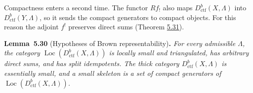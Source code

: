 \documentclass[11pt]{article}
\newenvironment{bpstatement}[2]{\par\addvspace{0.6\baselineskip}\noindent\textbf{#1}#2\textbf{.}\enspace\ignorespaces}
  {\par\addvspace{0.4\baselineskip}}
\newenvironment{bpstatementit}[2]{\begin{bpstatement}{#1}{#2}\itshape\ignorespaces}{\end{bpstatement}}
\providecommand{\Loc}{}\renewcommand{\Loc}{\operatorname{Loc}}
\begin{document}
Compactness enters a second time. The functor \(Rf_!\) also maps \(D^b_{\mathrm{ctf}}(X,\Lambda)\) into \(D^b_{\mathrm{ctf}}(Y,\Lambda)\), so it sends the compact generators to compact objects. For this reason the adjoint \(f^!\) preserves direct sums (Theorem \hyperref[bp100]{5.31}).

\label{bp97}%
\begin{bpstatementit}{Lemma~5.30}{ (Hypotheses of Brown representability)}
For every admissible \(\Lambda\), the category \(\Loc(D^b_{\mathrm{ctf}}(X,\Lambda))\) is locally small and triangulated, has arbitrary direct sums, and has split idempotents. The thick category \(D^b_{\mathrm{ctf}}(X,\Lambda)\) is essentially small, and a small skeleton is a set of compact generators of \(\Loc(D^b_{\mathrm{ctf}}(X,\Lambda))\).
\end{bpstatementit}
\end{document}
